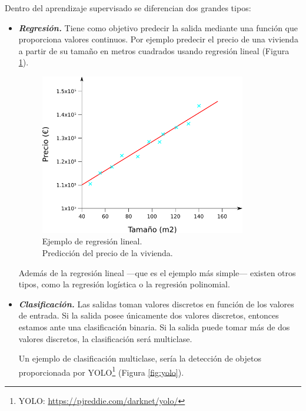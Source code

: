 \noindent Dentro del aprendizaje supervisado se diferencian dos grandes tipos:
\begin{itemize}
\item \textit{\textbf{Regresión.}} Tiene como objetivo predecir la salida mediante una función que proporciona valores continuos. Por ejemplo predecir el precio de una vivienda a partir de su tamaño en metros cuadrados usando regresión lineal (Figura \ref{fig:ejemplo_regresion}).

\begin{figure} [h!]
  \begin{center}
    \includegraphics[width=9cm]{figs/ejemplo_regresion.png}
  \end{center}
  \caption{Ejemplo de regresión lineal.\\
  Predicción del precio de la vivienda.}
  \label{fig:ejemplo_regresion}
\end{figure}

Además de la regresión lineal ---que es el ejemplo más simple--- existen otros tipos, como la regresión logística o la regresión polinomial.

\item \textit{\textbf{Clasificación.}} Las salidas toman valores discretos en función de los valores de entrada. Si la salida posee únicamente dos valores discretos, entonces estamos ante una clasificación binaria. Si la salida puede tomar más de dos valores discretos, la clasificación será multiclase.

Un ejemplo de clasificación multiclase, sería la detección de objetos proporcionada por YOLO\footnote{YOLO: \url{https://pjreddie.com/darknet/yolo/}} (Figura \ref{fig:yolo}).


\end{itemize}
